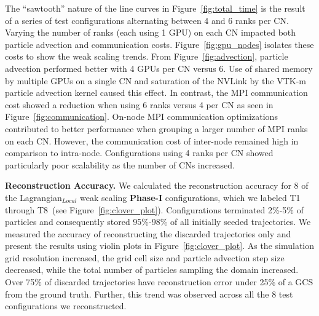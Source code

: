 %
%
The ``sawtooth'' nature of the line curves in Figure~\ref{fig:total_time} is the result of a series of test configurations alternating between 4 and 6 ranks per CN.
%
Varying the number of ranks (each using 1 GPU) on each CN impacted both particle advection and communication costs.
%
Figure~\ref{fig:gpu_nodes} isolates these costs to show the weak scaling trends.
%
%
%
%
From Figure~\ref{fig:advection}, particle advection performed better with 4 GPUs per CN versus 6.
%
Use of shared memory by multiple GPUs on a single CN and saturation of the NVLink by the VTK-m particle advection kernel caused this effect.
%
%
%
In contrast, the MPI communication cost showed a reduction when using 6 ranks versus 4 per CN as seen in Figure~\ref{fig:communication}. 
%
%
On-node MPI communication optimizations contributed to better performance when grouping a larger number of MPI ranks on each CN. 
%
However, the communication cost of inter-node remained high in comparison to intra-node.
%
Configurations using 4 ranks per CN showed particularly poor scalability as the number of CNs increased.
%
%
%

\textbf{Reconstruction Accuracy.}
We calculated the reconstruction accuracy for 8 of the Lagrangian$_{Local}$ weak scaling \textbf{Phase-I} configurations, which we labeled T1 through T8~(see Figure~\ref{fig:clover_plot}). 
%
Configurations terminated 2\%-5\% of particles and consequently stored 95\%-98\% of all initially seeded trajectories. 
%
We measured the accuracy of reconstructing the discarded trajectories only and present the results using violin plots in Figure~\ref{fig:clover_plot}.
%
As the simulation grid resolution increased, the grid cell size and particle advection step size decreased, while the total number of particles sampling the domain increased. 
%
Over 75\% of discarded trajectories have reconstruction error under 25\% of a GCS from the ground truth.
%
Further, this trend was observed across all the 8 test configurations we reconstructed. 

